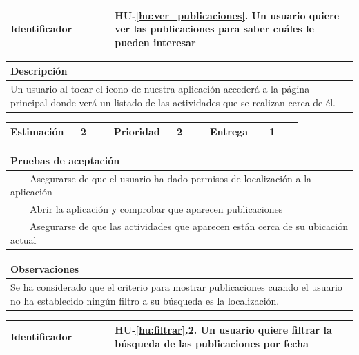 \documentclass[11pt]{article}
\newcommand{\tabitem}{~~\llap{\textbullet}~~}
\begin{document}

  \centering
  \begin{longtable}{p{0.3\linewidth}|p{0.7\linewidth}}
    \toprule
    \toprule
    \textbf{Identificador} & \textbf{HU-\ref{hu:ver_publicaciones}}. Un usuario quiere ver las publicaciones para saber cuáles le pueden interesar\\
    
    \bottomrule
  \end{longtable}

  \begin{longtable}{p{1.028\linewidth}}
    \textbf{Descripción}\\
    \midrule
    Un usuario al tocar el icono de nuestra aplicación accederá a la página principal donde verá un listado de las actividades que se realizan cerca de él.
  \end{longtable}
  \begin{longtable}{p{0.18\linewidth}|p{0.1\linewidth}|p{0.18\linewidth}|p{0.1\linewidth}|p{0.18\linewidth}|p{0.1\linewidth}}
    \toprule
    \textbf{Estimación} & 2 & \textbf{Prioridad} & 2 & \textbf{Entrega} & 1 \\
    \bottomrule
  \end{longtable}

  \begin{longtable}{p{1.028\linewidth}}
    \textbf{Pruebas de aceptación}\\
    \midrule
    \tabitem Asegurarse de que el usuario ha dado permisos de localización a la aplicación\\
    \tabitem Abrir la aplicación y comprobar que aparecen publicaciones\\
    \tabitem Asegurarse de que las actividades que aparecen están cerca de su ubicación actual\\
\end{longtable}
\begin{longtable}{p{1.028\linewidth}}
  \textbf{Observaciones}\\
  \midrule
  Se ha considerado que el criterio para mostrar publicaciones cuando el usuario no ha establecido ningún filtro a su búsqueda es la localización.\\
  \bottomrule
  \bottomrule
\end{longtable}

  \centering
  \begin{longtable}{p{0.3\linewidth}|p{0.7\linewidth}}
    \toprule
    \toprule
    \textbf{Identificador} & \textbf{HU-\ref{hu:filtrar}.2}. Un usuario quiere filtrar la búsqueda de las publicaciones por fecha\\
    
    \bottomrule
  \end{longtable}
\end{document}
